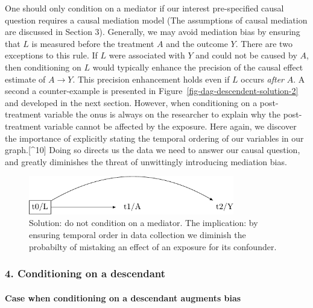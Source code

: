 \documentclass[
  singlecolumn,
  9pt]{article}
\let\oldparagraph\paragraph
\renewcommand{\paragraph}[1]{\oldparagraph{#1}\mbox{}}
\begin{document}
One should only condition on a mediator if our interest pre-specified
causal question requires a causal mediation model (The assumptions of
causal mediation are discussed in Section 3). Generally, we may avoid
mediation bias by ensuring that \(L\) is measured before the treatment
\(A\) and the outcome \(Y\). There are two exceptions to this rule. If
\(L\) were associated with \(Y\) and could not be caused by \(A\), then
conditioning on \(L\) would typically enhance the precision of the
causal effect estimate of \(A \to Y\). This precision enhancement holds
even if \(L\) occurs \emph{after} \(A\). A second a counter-example is
presented in Figure~\ref{fig-dag-descendent-solution-2} and developed in
the next section. However, when conditioning on a post-treatment
variable the onus is always on the researcher to explain why the
post-treatment variable cannot be affected by the exposure. Here again,
we discover the importance of explicitly stating the temporal ordering
of our variables in our graph.{[}\^{}10{]} Doing so directs us the data
we need to answer our causal question, and greatly diminishes the threat
of unwittingly introducing mediation bias.

\begin{figure}

{\centering \includegraphics[width=0.8\textwidth,height=\textheight]{causal-dags_files/figure-pdf/fig-dag-mediator-solution-1.pdf}

}

\caption{\label{fig-dag-mediator-solution}Solution: do not condition on
a mediator. The implication: by ensuring temporal order in data
collection we diminish the probabilty of mistaking an effect of an
exposure for its confounder.}

\end{figure}

\subsubsection{4. Conditioning on a
descendant}\label{conditioning-on-a-descendant}

\paragraph{Case when conditioning on a descendant augments
bias}\label{case-when-conditioning-on-a-descendant-augments-bias}
\end{document}
